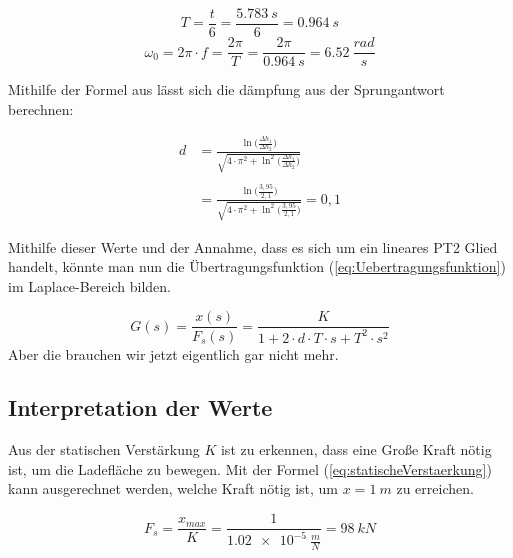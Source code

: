 \begin{equation}
	T = \frac{t}{6} = \frac{\SI{5,783}{s}}{6} = \SI{0,964}{s}
\end{equation}
\begin{equation}
	\omega_{0} = 2 \pi \cdot f = \frac{2 \pi}{T} = \frac{2 \pi}{\SI{0,964}{s}}  = \SI{6,52}{\frac{rad}{s}}
\end{equation}

Mithilfe der Formel aus \cite[Tabelle 9.8]{karlsruherPT2Glied} lässt sich die dämpfung aus der Sprungantwort berechnen:

\begin{equation}
	\begin{split}
		d &= \frac{\ln\Big(\frac{\Delta h_{1}}{\Delta h_{2}}\Big)}{\sqrt{4 \cdot \pi ^2 + \ln ^2 \Big(\frac{\Delta h_{1}}{\Delta h_{2}}\Big)}} \\
		\\
			&= \frac{\ln\Big(\frac{3,95}{2,1}\Big)}{\sqrt{4 \cdot \pi ^2 + \ln ^2 \Big(\frac{3,95}{2,1}\Big)}}
			= 0,1
	\end{split}
\end{equation}

Mithilfe dieser Werte und der Annahme, dass es sich um ein lineares PT2 Glied handelt, könnte man nun die Übertragungsfunktion (\ref{eq:Uebertragungsfunktion}) im Laplace-Bereich bilden.

\begin{equation}
	G(s) = \frac{x(s)}{F_{s}(s)} = \frac{K}{1 + 2 \cdot d \cdot T \cdot s + T^2 \cdot s^2}
	\label{eq:Uebertragungsfunktion}
\end{equation}
Aber die brauchen wir jetzt eigentlich gar nicht mehr.


\subsection{Interpretation der Werte}\label{subSec:Interpraetation}
Aus der statischen Verstärkung $K$ ist zu erkennen, dass eine Große Kraft nötig ist, um die Ladefläche zu bewegen. Mit der Formel (\ref*{eq:statischeVerstaerkung}) kann ausgerechnet werden, welche Kraft nötig 
ist, um $x = \SI{1}{m}$ zu erreichen.

\begin{equation}
	F_{s}= \frac{x_{max}}{K}  = \frac{1}{\SI{1,02e-5}{ \frac{m}{N}}} = \SI{98}{kN}
\end{equation}

